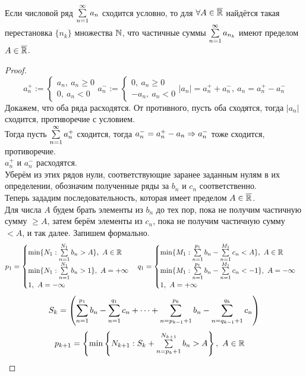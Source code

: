\begin{theorem}\label{14_th14}\\
	Если числовой ряд $\ss a_n$ сходится условно, то для $\forall A\in\overline{\mathbb{R}}$ найдётся такая перестановка $\{n_k\}$ множества $\mathbb{N}$, что частичные суммы $\ss a_{n_k}$ имеют пределом $A\in\overline{\mathbb{R}}$.
\end{theorem}
\begin{proof}
	\[a_n^+:=
	\begin{cases}
		a_n,\ a_n\ge0\\
		0,\ a_n<0
	\end{cases}
	a_n^-:=
	\begin{cases}
		0,\ a_n\ge0\\
		-a_n,\ a_n<0
	\end{cases}
	|a_n|=a_n^++a_n^-,\ a_n=a_n^+-a_n^-\]
	Докажем, что оба ряда расходятся. От противного, пусть оба сходятся, тогда $|a_n|$ сходится, противоречие с условием.\\
	Тогда пусть $\ss a_n^+$ сходится, тогда $a_n^-=a_n^+-a_n\Rightarrow a_n^-$ тоже сходится, противоречие.\\
	$a_n^+$ и $a_n^-$ расходятся.\\
	Уберём из этих рядов нули, соответствующие заранее заданным нулям в их определении, обозначим полученные ряды за $b_n$ и $c_n$ соответственно.\\
	Теперь зададим последовательность, которая имеет пределом $A\in\overline{\mathbb{R}}$.\\
	Для числа $A$ будем брать элементы из $b_n$ до тех пор, пока не получим частичную сумму $\ge A$, затем берём элементы из $c_n$, пока не получим частичную сумму $<A$, и так далее. Запишем формально.
	\[p_1=
	\begin{cases}
		\min\{N_1:\sum_{n=1}^{N_1}b_n>A\},\ A\in\R\\
		\min\{N_1:\sum_{n=1}^{N_1}b_n>1\},\ A=+\i\\
		1,\ A=-\i
	\end{cases}
	q_1=
	\begin{cases}
		\min\{M_1:\sum_{n=1}^{p_1}b_n-\sum_{n=1}^{M_1}c_n<A\},\ A\in\R\\
		\min\{M_1:\sum_{n=1}^{p_1}b_n-\sum_{n=1}^{M_1}c_n<-1\},\ A=-\i\\
		1,\ A=+\i
	\end{cases}
	\]
	\[S_k=\l(\sum_{n=1}^{p_1}b_n-\sum_{n=1}^{q_1}c_n+\dots+\sum_{n=p_{k-1}+1}^{p_k}b_n-\sum_{n=q_{k-1}+1}^{q_k}c_n\r)\]
	\[p_{k+1}=
	\begin{cases}
		\min\l\{N_{k+1}:S_k+\sum_{n=p_k+1}^{N_{k+1}}b_n>A\r\},\ A\in\R\\

\end{cases}\]
\end{proof}
